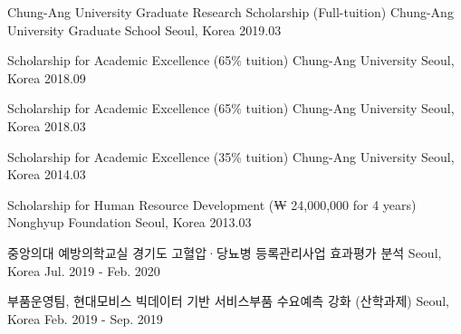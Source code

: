 \documentclass[11pt, a4paper]{awesome-cv} %
\begin{document}
\begin{cvhonors}
	\cvhonor
	{Chung-Ang University Graduate Research Scholarship (Full-tuition)} %
	{Chung-Ang University Graduate School} %
	{Seoul, Korea} %
	{2019.03} %
	
	\cvhonor
	{Scholarship for Academic Excellence (65\% tuition)} %
	{Chung-Ang University} %
	{Seoul, Korea} %
	{2018.09} %
	
	\cvhonor
	{Scholarship for Academic Excellence (65\% tuition)} %
	{Chung-Ang University} %
	{Seoul, Korea} %
	{2018.03} %
	
	\cvhonor
	{Scholarship for Academic Excellence (35\% tuition)} %
	{Chung-Ang University} %
	{Seoul, Korea} %
	{2014.03} %
	
	\cvhonor
	{Scholarship for Human Resource Development (₩ 24,000,000 for 4 years)} %
	{Nonghyup Foundation} %
	{Seoul, Korea} %
	{2013.03} %
\end{cvhonors}



\begin{cventries}
	\cventry
	{중앙의대 예방의학교실} %
	{경기도 고혈압·당뇨병 등록관리사업 효과평가 분석} %
	{Seoul, Korea} %
	{Jul. 2019 - Feb. 2020} %
	{ %
	}
	
	\cventry
	{부품운영팀, 현대모비스} %
	{빅데이터 기반 서비스부품 수요예측 강화 (산학과제)} %
	{Seoul, Korea} %
	{Feb. 2019 - Sep. 2019} %
	{ %
	}
\end{cventries}
\end{document}
